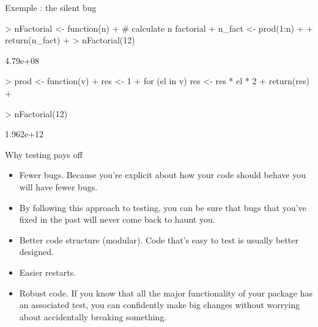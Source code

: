 \documentclass[12pt,handout]{beamer}
\begin{document}
\begin{frame}[fragile]{Exemple : the silent bug}

\begin{Schunk}
\begin{Sinput}
> nFactorial <- function(n) {
+ 	# calculate n factorial
+ 	n_fact <- prod(1:n)
+ 
+ 	return(n_fact)
+ }
> nFactorial(12)
\end{Sinput}
\begin{Soutput}
[1] 4.79e+08
\end{Soutput}
\end{Schunk}
\end{frame}

\begin{frame}[fragile]
\begin{Schunk}
\begin{Sinput}
> prod <- function(v){
+ 	res <- 1
+ 	for (el in v) res <- res * el * 2
+ 	return(res)
+ }
\end{Sinput}
\end{Schunk}

\begin{Schunk}
\begin{Sinput}
> nFactorial(12)
\end{Sinput}
\begin{Soutput}
[1] 1.962e+12
\end{Soutput}
\end{Schunk}
\end{frame}


\begin{frame}[fragile]{Why testing pays off}
\begin{itemize}

\item Fewer bugs. Because you're explicit about how your code should behave
  you will have fewer bugs.

\item  By following this approach to testing, you can be sure that bugs 
  that you've fixed in the past will never come back to haunt you.

\item Better code structure (modular). Code that's easy to test is usually better designed.

\item Easier restarts.

\item Robust code. If you know that all the major functionality of your package has 
  an associated test, you can confidently make big changes without worrying 
  about accidentally breaking something.

\end{itemize}


\end{frame}
\end{document}
